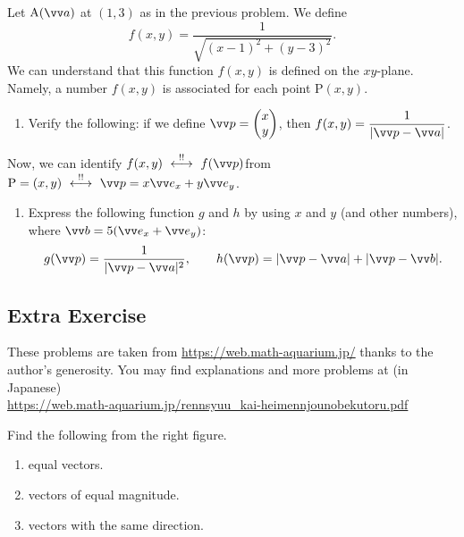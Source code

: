 \documentclass[11pt,pdfa,lastpage]{MishoNote}
\begin{document}
\begin{problems}
\Problem[B] Let $\posvec Aa$ at $(1,3)$ as in the previous problem. We define
\[f(x,y)=\frac{1}{\sqrt{(x-1)^2+(y-3)^2}}.  \]
We can understand that this function $f(x,y)$ is defined on the $xy$-plane. Namely, a number $f(x,y)$ is associated for each point P$(x,y)$.
\begin{enumerate}
  \item Verify the following: if we define $\vc p=\pmat{x\\y}$, then $f(x,y)=\dfrac{1}{|\vc p-\vc a|}$.
\end{enumerate}
 Now, we can identify $f(x,y)\idrel f(\vc p)$\quad from\quad $\mathrm{P}=(x,y)\idrel \vc p=x\vvex+y\vvey$.
 \begin{enumerate}[start=2]
  \item Express the following function $g$ and $h$ by using $x$ and $y$ (and other numbers), where $\vc b=5(\vvex+\vvey)$:
  \[g(\vc p)=\frac{1}{|\vc p-\vc a|^2},\qquad
  h(\vc p)=|\vc p-\vc a|+|\vc p-\vc b|.
  \]
\end{enumerate}
\end{problems}

\newpage
\subsection{Extra Exercise}
These problems are taken from  \url{https://web.math-aquarium.jp/} thanks to the author's generosity. You may find explanations and more problems at (in Japanese)\\
\phantom{extra space} \url{https://web.math-aquarium.jp/rennsyuu_kai-heimennjounobekutoru.pdf}
\smallskip

\noindent{}

\bigskip

\begingroup
\renewcommand\theenumi{\arabic{enumi}}
\noindent
\begin{minipage}[t]{0.55\textwidth}
\begin{enumerate}
 \itemA Find the following from the right figure.
\begin{enumerate}[leftmargin=1.5em,labelsep=-0.3em]
 \item equal vectors.
 \item vectors of equal magnitude.
 \item vectors with the same direction.
\end{enumerate}
\end{enumerate}
\end{minipage}
\begin{minipage}[t]{0.4\textwidth}\kern20pt\vspace{-2.5em}
\end{minipage}
\end{document}
